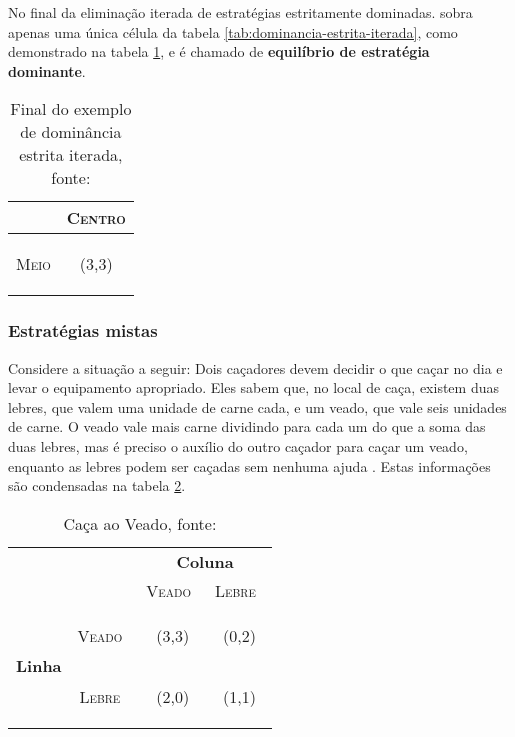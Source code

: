 No final da eliminação iterada de estratégias estritamente dominadas. sobra apenas uma única célula da tabela \ref{tab:dominancia-estrita-iterada}, como demonstrado na tabela \ref{tab:final-dominancia-estrita-iterada}, e é chamado de \textbf{equilíbrio de estratégia dominante}.

\begin{table}[ht]
\centering
\begin{tabular}{|c|c|}
\cline{2-2}
\multicolumn{1}{c|}{} & {\scshape Centro} \tabularnewline
\hline
\begin{turn}{90}
{\scshape Meio}
\end{turn} &  {\Large(}{\Large 3,}{\Large 3)}\tabularnewline
\hline
\end{tabular}
\caption{Final do exemplo de dominância estrita iterada, fonte: \cite{spaniel_2011}}
\label{tab:final-dominancia-estrita-iterada}
\end{table}

\subsubsection{Estratégias mistas}

Considere a situação a seguir: Dois caçadores devem decidir o que caçar no dia e levar o equipamento apropriado. Eles sabem que, no local de caça, existem duas lebres, que valem uma unidade de carne cada, e um veado, que vale seis unidades de carne. O veado vale mais carne dividindo para cada um do que a soma das duas lebres, mas é preciso o auxílio do outro caçador para caçar um veado, enquanto as lebres podem ser caçadas sem nenhuma ajuda \cite{spaniel_2011}. Estas informações são condensadas na tabela \ref{tab:caca-ao-viado}.

\begin{table}[ht]
\centering
\begin{tabular}{|c|c|c|c|}
	\cline{3-4}
	\multicolumn{1}{c}{} &  & \multicolumn{2}{c|}{{\bfseries Coluna}}\tabularnewline
	\cline{3-4}
	\multicolumn{1}{c}{} &  & {\scshape Veado}\  & {\scshape Lebre}\ \tabularnewline
	\hline
	\multirow{2}{*}{\begin{turn}{90}
	{\bfseries Linha}
	\end{turn}} & \begin{turn}{90}
	{\scshape Veado}\
	\end{turn} & {\Large(3,3)} & {\Large(0,2)}\tabularnewline
	\cline{2-4}
	 & \begin{turn}{90}
	{\scshape Lebre}\
	\end{turn} & {\Large(2,0)} & {\Large(1,1)}\tabularnewline
	\hline
\end{tabular}
\caption{Caça ao Veado, fonte: \cite{spaniel_2011}}
\label{tab:caca-ao-viado}
\end{table}


